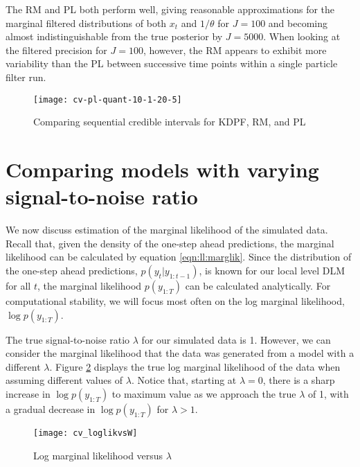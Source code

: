 The RM and PL both perform well, giving reasonable approximations for the marginal filtered distributions of both $x_t$ and $1/\theta$ for $J = 100$ and becoming almost indistinguishable from the true posterior by $J = 5000$. When looking at the filtered precision for $J = 100$, however, the RM appears to exhibit more variability than the PL between successive time points within a single particle filter run.

\begin{figure}[ht]
\ssp
\centering
\caption{Comparing sequential credible intervals for KDPF, RM, and PL} \label{fig:comp:quant}
\texttt{[image: cv-pl-quant-10-1-20-5]}
\end{figure}

\section{Comparing models with varying signal-to-noise ratio} \label{sec:comp:models}

We now discuss estimation of the marginal likelihood of the simulated data. Recall that, given the density of the one-step ahead predictions, the marginal likelihood can be calculated by equation \eqref{eqn:ll:marglik}. Since the distribution of the one-step ahead predictions, $p(y_t|y_{1:t-1})$, is known for our local level DLM for all $t$, the marginal likelihood $p(y_{1:T})$ can be calculated analytically. For computational stability, we will focus most often on the log marginal likelihood, $\log p(y_{1:T})$.

The true signal-to-noise ratio $\lambda$ for our simulated data is 1. However, we can consider the marginal likelihood that the data was generated from a model with a different $\lambda$. Figure \ref{fig:comp:lambda} displays the true log marginal likelihood of the data when assuming different values of $\lambda$. Notice that, starting at $\lambda = 0$, there is a sharp increase in $\log p(y_{1:T})$ to maximum value as we approach the true $\lambda$ of 1, with a gradual decrease in $\log p(y_{1:T})$ for $\lambda > 1$.

\begin{figure}[ht]
\ssp
\centering
\caption{Log marginal likelihood versus $\lambda$} \label{fig:comp:lambda}
\texttt{[image: cv\_loglikvsW]}
\end{figure}

